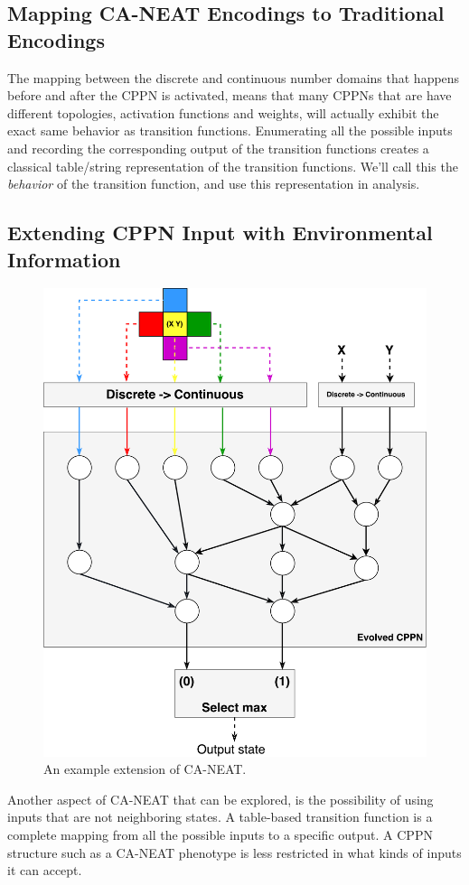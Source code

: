 \subsection{Mapping CA-NEAT Encodings to Traditional Encodings}
\label{sec:behavior}
The mapping between the discrete and continuous number domains that happens before and after the CPPN is activated,
means that many CPPNs that are have different topologies, activation functions and weights,
will actually exhibit the exact same behavior as transition functions.
Enumerating all the possible inputs and recording the corresponding output of the transition functions creates a classical table/string representation of the transition functions.
We'll call this the \textit{behavior} of the transition function, and use this representation in analysis.

\subsection{Extending CPPN Input with Environmental Information}
\label{sec:input_extensions}
\begin{figure}
\centering
\includegraphics[width=.7\columnwidth]{fig/CA_NEAT_extension}
\caption{
    An example extension of CA-NEAT.
}
\label{fig:CA_NEAT_extension}
\end{figure}

Another aspect of CA-NEAT that can be explored, is the possibility of using inputs that are not neighboring states.
A table-based transition function is a complete mapping from all the possible inputs to a specific output.
A CPPN structure such as a CA-NEAT phenotype is less restricted in what kinds of inputs it can accept.

